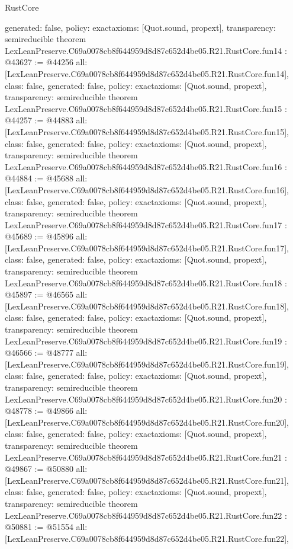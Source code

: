 \begin{lexlean}{RustCore}
\begin{coremodule}
{  generated: false,
  policy: exact{axioms: [Quot.sound, propext]},
  transparency: semireducible
}
theorem LexLeanPreserve.C69a0078cb8f644959d8d87c652d4be05.R21.RustCore.fun14 : @43627 := @44256 {
  all: [LexLeanPreserve.C69a0078cb8f644959d8d87c652d4be05.R21.RustCore.fun14],
  class: false,
  generated: false,
  policy: exact{axioms: [Quot.sound, propext]},
  transparency: semireducible
}
theorem LexLeanPreserve.C69a0078cb8f644959d8d87c652d4be05.R21.RustCore.fun15 : @44257 := @44883 {
  all: [LexLeanPreserve.C69a0078cb8f644959d8d87c652d4be05.R21.RustCore.fun15],
  class: false,
  generated: false,
  policy: exact{axioms: [Quot.sound, propext]},
  transparency: semireducible
}
theorem LexLeanPreserve.C69a0078cb8f644959d8d87c652d4be05.R21.RustCore.fun16 : @44884 := @45688 {
  all: [LexLeanPreserve.C69a0078cb8f644959d8d87c652d4be05.R21.RustCore.fun16],
  class: false,
  generated: false,
  policy: exact{axioms: [Quot.sound, propext]},
  transparency: semireducible
}
theorem LexLeanPreserve.C69a0078cb8f644959d8d87c652d4be05.R21.RustCore.fun17 : @45689 := @45896 {
  all: [LexLeanPreserve.C69a0078cb8f644959d8d87c652d4be05.R21.RustCore.fun17],
  class: false,
  generated: false,
  policy: exact{axioms: [Quot.sound, propext]},
  transparency: semireducible
}
theorem LexLeanPreserve.C69a0078cb8f644959d8d87c652d4be05.R21.RustCore.fun18 : @45897 := @46565 {
  all: [LexLeanPreserve.C69a0078cb8f644959d8d87c652d4be05.R21.RustCore.fun18],
  class: false,
  generated: false,
  policy: exact{axioms: [Quot.sound, propext]},
  transparency: semireducible
}
theorem LexLeanPreserve.C69a0078cb8f644959d8d87c652d4be05.R21.RustCore.fun19 : @46566 := @48777 {
  all: [LexLeanPreserve.C69a0078cb8f644959d8d87c652d4be05.R21.RustCore.fun19],
  class: false,
  generated: false,
  policy: exact{axioms: [Quot.sound, propext]},
  transparency: semireducible
}
theorem LexLeanPreserve.C69a0078cb8f644959d8d87c652d4be05.R21.RustCore.fun20 : @48778 := @49866 {
  all: [LexLeanPreserve.C69a0078cb8f644959d8d87c652d4be05.R21.RustCore.fun20],
  class: false,
  generated: false,
  policy: exact{axioms: [Quot.sound, propext]},
  transparency: semireducible
}
theorem LexLeanPreserve.C69a0078cb8f644959d8d87c652d4be05.R21.RustCore.fun21 : @49867 := @50880 {
  all: [LexLeanPreserve.C69a0078cb8f644959d8d87c652d4be05.R21.RustCore.fun21],
  class: false,
  generated: false,
  policy: exact{axioms: [Quot.sound, propext]},
  transparency: semireducible
}
theorem LexLeanPreserve.C69a0078cb8f644959d8d87c652d4be05.R21.RustCore.fun22 : @50881 := @51554 {
  all: [LexLeanPreserve.C69a0078cb8f644959d8d87c652d4be05.R21.RustCore.fun22],
}
\end{coremodule}
\end{lexlean}
